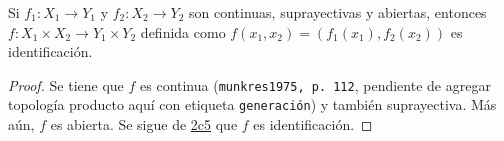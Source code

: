 
\begin{proposition}
Si $f_1 : X_1 \longrightarrow Y_1$ y $f_2 : X_2 \longrightarrow Y_2$ son continuas, suprayectivas y abiertas, entonces $f : X_1 \times X_2 \longrightarrow Y_1 \times Y_2$ definida como $f(x_1, x_2) = (f_1(x_1), f_2(x_2))$ es identificación.
\end{proposition}

\begin{proof}
Se tiene que $f$ es continua (\texttt{munkres1975, p. 112}, pendiente de agregar topología producto aquí con etiqueta \texttt{generación}) y también suprayectiva. Más aún, $f$ es abierta. Se sigue de \hyperref[card:2c5]{\textsf{2c5}} que $f$ es identificación.
\end{proof}
